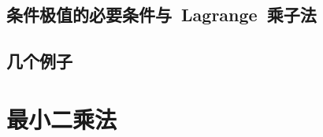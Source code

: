 \subsection{条件极值的必要条件与~Lagrange~乘子法}
\subsection{几个例子}
\begin{exercise}
\item
\end{exercise}
\section{最小二乘法}
\begin{exercise}
\item
\end{exercise}
\begin{exercise*}
\item
\end{exercise*}




\endinput

